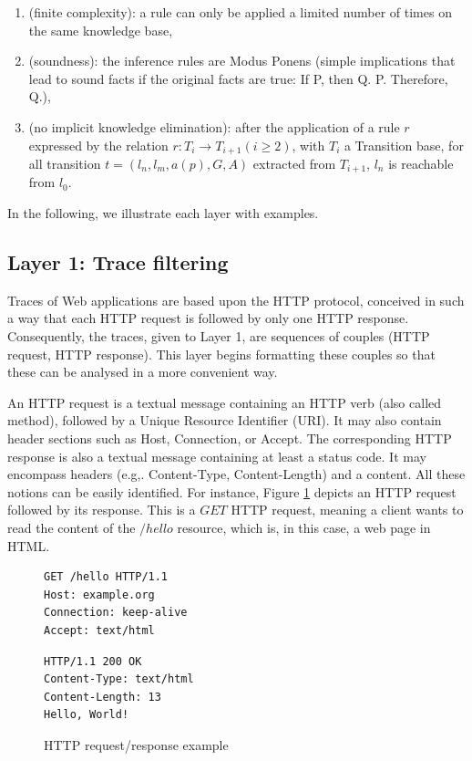 \begin{enumerate}
\item (finite complexity): a rule can only be applied a limited
number of times on the same knowledge base,

\item (soundness): the inference rules are Modus Ponens (simple
implications that lead to sound facts if the original facts are
true: If P, then Q. P. Therefore, Q.),

\item (no implicit knowledge elimination): after the application
of a rule $r$ expressed by the relation $r: T_i \rightarrow
T_{i+1} (i\geq 2)$, with $T_i$ a Transition base, for all
transition $t=(l_n,l_m,a(p),G,A)$ extracted from $T_{i+1}$, $l_n$
is reachable from $l_0$.
\end{enumerate}

In the following, we illustrate each layer with examples.

\subsection{Layer 1: Trace filtering}
\label{sec:modelinf:webapps:L1}

Traces of Web applications are based upon the HTTP protocol,
conceived in such a way that each HTTP request is followed by
only one HTTP response. Consequently, the traces, given to Layer
1, are sequences of couples (HTTP request, HTTP response). This
layer begins formatting these couples so that these can be
analysed in a more convenient way.

An HTTP request is a textual message containing an HTTP verb
(also called method), followed by a Unique Resource Identifier
(URI). It may also contain header sections such as Host,
Connection, or Accept. The corresponding HTTP response is also a
textual message containing at least a status code. It may
encompass headers (e.g,.  Content-Type, Content-Length) and a
content. All these notions can be easily identified. For
instance, Figure \ref{fig:httpexample} depicts an HTTP request
followed by its response. This is a $GET$ HTTP request, meaning a
client wants to read the content of the $/hello$ resource, which
is, in this case, a web page in HTML.

\begin{figure}[ht]
\begin{framed}
\begin{BVerbatim}
GET /hello HTTP/1.1
Host: example.org
Connection: keep-alive
Accept: text/html
\end{BVerbatim}
\end{framed}

\begin{framed}
\begin{BVerbatim}
HTTP/1.1 200 OK
Content-Type: text/html
Content-Length: 13
Hello, World!
\end{BVerbatim}
\end{framed}

\caption{HTTP request/response example}
\label{fig:httpexample}
\end{figure}

